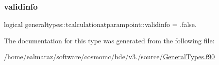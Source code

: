 \mbox{\label{structgeneraltypes_1_1tcalculationatparampoint_a9e1654eea11b394f3055429ec0d750d8}} 
\subsubsection{\texorpdfstring{validinfo}{validinfo}}
{\footnotesize\ttfamily logical generaltypes\+::tcalculationatparampoint\+::validinfo = .false.\hspace{0.3cm}{\ttfamily [private]}}



The documentation for this type was generated from the following file\+:\begin{DoxyCompactItemize}
\item 
/home/ealmaraz/software/cosmomc/bde/v3./source/\mbox{\hyperlink{GeneralTypes_8f90}{General\+Types.\+f90}}\end{DoxyCompactItemize}
